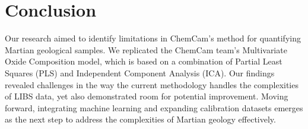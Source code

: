 \section{Conclusion}\label{sec:conclusion}
Our research aimed to identify limitations in ChemCam's method for quantifying Martian geological samples.
We replicated the ChemCam team's Multivariate Oxide Composition model, which is based on a combination of Partial Least Squares (PLS) and Independent Component Analysis (ICA).
Our findings revealed challenges in the way the current methodology handles the complexities of LIBS data, yet also demonstrated room for potential improvement.
Moving forward, integrating machine learning and expanding calibration datasets emerges as the next step to address the complexities of Martian geology effectively.